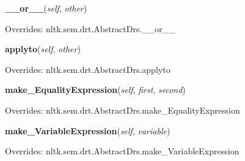     \vspace{0.5ex}

\hspace{.8\funcindent}\begin{boxedminipage}{\funcwidth}

    \raggedright \textbf{\_\_or\_\_}(\textit{self}, \textit{other})

\setlength{\parskip}{2ex}
\setlength{\parskip}{1ex}
      Overrides: nltk.sem.drt.AbstractDrs.\_\_or\_\_

    \end{boxedminipage}

    \vspace{0.5ex}

\hspace{.8\funcindent}\begin{boxedminipage}{\funcwidth}

    \raggedright \textbf{applyto}(\textit{self}, \textit{other})

\setlength{\parskip}{2ex}
\setlength{\parskip}{1ex}
      Overrides: nltk.sem.drt.AbstractDrs.applyto

    \end{boxedminipage}

    \vspace{0.5ex}

\hspace{.8\funcindent}\begin{boxedminipage}{\funcwidth}

    \raggedright \textbf{make\_EqualityExpression}(\textit{self}, \textit{first}, \textit{second})

\setlength{\parskip}{2ex}
\setlength{\parskip}{1ex}
      Overrides: nltk.sem.drt.AbstractDrs.make\_EqualityExpression

    \end{boxedminipage}

    \vspace{0.5ex}

\hspace{.8\funcindent}\begin{boxedminipage}{\funcwidth}

    \raggedright \textbf{make\_VariableExpression}(\textit{self}, \textit{variable})

\setlength{\parskip}{2ex}
\setlength{\parskip}{1ex}
      Overrides: nltk.sem.drt.AbstractDrs.make\_VariableExpression

    \end{boxedminipage}


